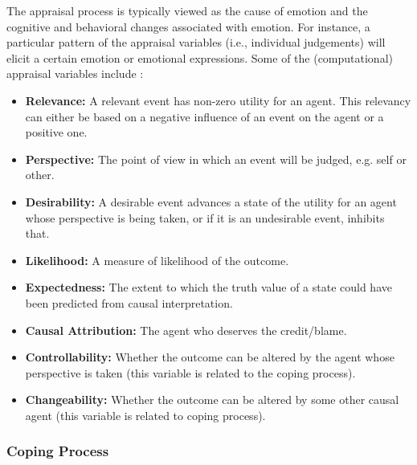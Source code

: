 \documentclass[12pt]{report}
\begin{document}
The appraisal process is typically viewed as the cause of emotion and the
cognitive and behavioral changes associated with emotion. For instance, a
particular pattern of the appraisal variables (i.e., individual judgements) will
elicit a certain emotion or emotional expressions. Some of the (computational)
appraisal variables include \cite{marsella:ema-process-model}:

\begin{itemize}
  \item \textbf{Relevance:} A relevant event has non-zero utility for an agent.
  This relevancy can either be based on a negative influence of an event on the
  agent or a positive one.
  
  \item \textbf{Perspective:} The point of view in which an event will be
  judged, e.g. self or other.
  
  \item \textbf{Desirability:} A desirable event advances a state of the utility
  for an agent whose perspective is being taken, or if it is an
  undesirable event, inhibits that.
  
  \item \textbf{Likelihood:} A measure of likelihood of the outcome.
  
  \item \textbf{Expectedness:} The extent to which the truth value of a state
  could have been predicted from causal interpretation.
  
  \item \textbf{Causal Attribution:} The agent who deserves the credit/blame.
  
  \item \textbf{Controllability:} Whether the outcome can be altered by the
  agent whose perspective is taken (this variable is related to the coping
  process).
  
  \item \textbf{Changeability:} Whether the outcome can be altered by some other
  causal agent (this variable is related to coping process).
\end{itemize}

\subsubsection{Coping Process}
\label{sec:coping-process}
\end{document}
